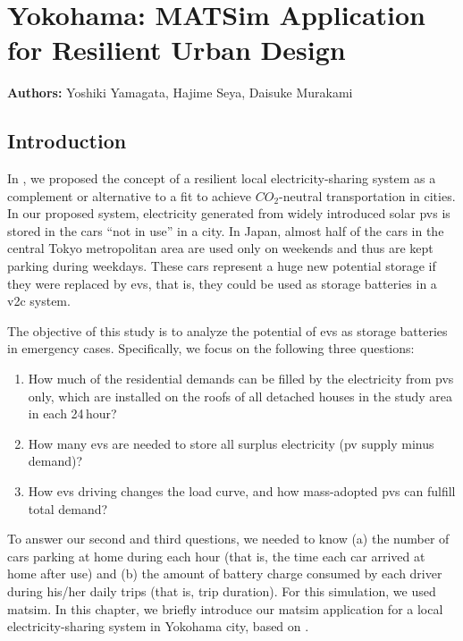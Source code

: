 \chapter{Yokohama: MATSim Application for Resilient Urban Design}
\label{ch:yokohama}
\hfill \textbf{Authors:} Yoshiki Yamagata, Hajime Seya, Daisuke Murakami

\section{Introduction}
In \citet[][]{YamagataSeya_ITSIET_2015}, we proposed the concept of a resilient local electricity-sharing system as a complement or alternative to a \gls{fit} to achieve $CO_2$-neutral transportation in cities. In our proposed system, electricity generated from widely introduced solar \glspl{pv}
is stored in the cars ``not in use'' in a city. In Japan, almost half of the cars in the central Tokyo metropolitan area are used only on weekends and thus are kept parking during weekdays. These cars represent a huge new potential storage if they were replaced by \glspl{ev}, that is, they could be used as storage batteries in a \gls{v2c} system. 

The objective of this study is to analyze the potential of \glspl{ev} as storage batteries in emergency cases. Specifically, we focus on the following three questions: 
\begin{enumerate}\styleEnumerate
\item How much of the residential demands can be filled by the electricity from \glspl{pv} only, which are installed on the roofs of all detached houses in the study area in each 24\,hour? 
\item How many \glspl{ev} are needed to store all surplus electricity (\gls{pv} supply minus demand)?
\item How \glspl{ev} driving changes the load curve, and how mass-adopted \glspl{pv} can fulfill total demand? 
\end{enumerate}
To answer our second and third questions, we needed to know (a) the number of cars parking at home during each hour (that is, the time each car arrived at home after use) and (b) the amount of battery charge consumed by each driver during his/her daily trips (that is, trip duration). For this simulation, we used \gls{matsim}. In this chapter, we briefly introduce our \gls{matsim} application for a local electricity-sharing system in Yokohama city, based on \citet[][]{YamagataSeya_ApE_2013, YamagataEtAl_EnPro_2014, YamagataEtAl_ICAE_2015}.

